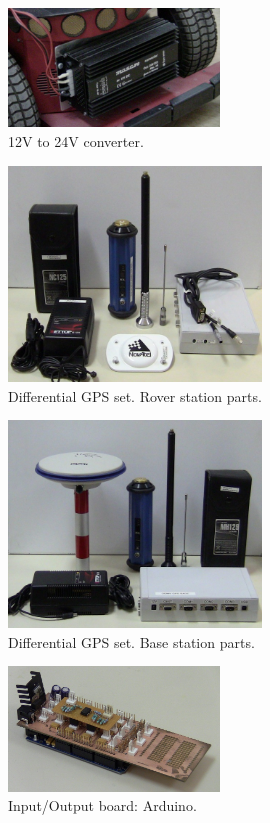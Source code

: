\begin{figure}[ht]
\centering
 \includegraphics[width=0.5\textwidth]{figures/device_photos/converter.jpg}
\caption{12V to 24V converter.}
\end{figure}

\begin{figure}[ht]
\centering
 \includegraphics[width=0.6\textwidth]{figures/device_photos/gps_rover.jpg}
\caption{Differential GPS set. Rover station parts.}
\end{figure}

\begin{figure}[ht]
\centering
 \includegraphics[width=0.6\textwidth]{figures/device_photos/gps_base.jpg}
\caption{Differential GPS set. Base station parts.}
\end{figure}

\begin{figure}[ht]
\centering
 \includegraphics[width=0.5\textwidth]{figures/device_photos/ioiv.jpg}
\caption{Input/Output board: Arduino.}
\end{figure}

